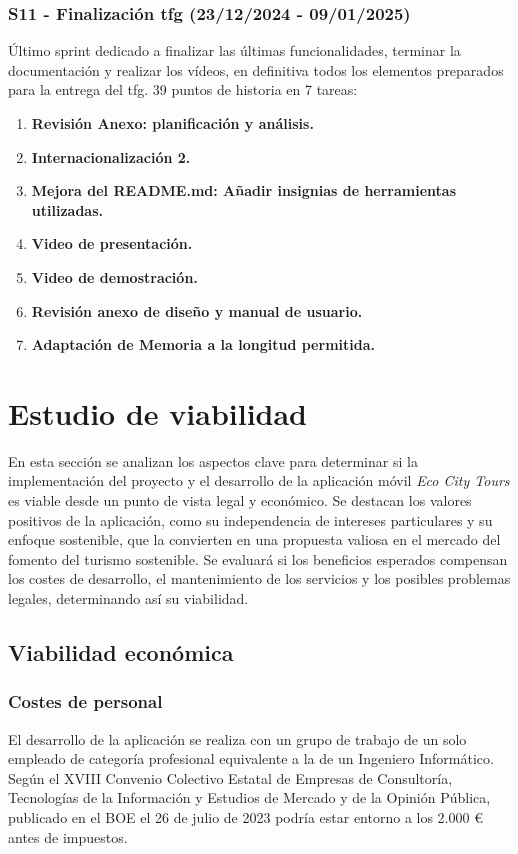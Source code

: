 \subsubsection{S11 - Finalización \acrshort{tfg} (23/12/2024 - 09/01/2025)}
Último sprint dedicado a finalizar las últimas funcionalidades, terminar la documentación y realizar los vídeos, en definitiva todos los elementos preparados para la entrega del \acrfull{tfg}. 39 puntos de historia en 7 tareas:
\begin{enumerate}
	\item \textbf{Revisión Anexo: planificación y análisis.}
	\item \textbf{Internacionalización 2.}
	\item \textbf{Mejora del README.md: Añadir insignias de herramientas utilizadas.}
	\item \textbf{Video de presentación.}
	\item \textbf{Video de demostración.}
	\item \textbf{Revisión anexo de diseño y manual de usuario.}
	\item \textbf{Adaptación de Memoria a la longitud permitida.}
\end{enumerate}



\section{Estudio de viabilidad}
En esta sección se analizan los aspectos clave para determinar si la implementación del proyecto y el desarrollo de la aplicación móvil \textit{Eco City Tours} es viable desde un punto de vista legal y económico. Se destacan los valores positivos de la aplicación, como su independencia de intereses particulares y su enfoque sostenible, que la convierten en una propuesta valiosa en el mercado del fomento del turismo sostenible. Se evaluará si los beneficios esperados compensan los costes de desarrollo, el mantenimiento de los servicios y los posibles problemas legales, determinando así su viabilidad.
\subsection{Viabilidad económica}
\subsubsection{Costes de personal}
El desarrollo de la aplicación se realiza con un grupo de trabajo de un solo empleado de categoría profesional equivalente a la de un Ingeniero Informático. Según el XVIII Convenio Colectivo Estatal de Empresas de Consultoría, Tecnologías de la Información y Estudios de Mercado y de la Opinión Pública, publicado en el BOE el 26 de julio de 2023 \cite{boe2023_consultoria} podría estar entorno a los 2.000 € antes de impuestos.


